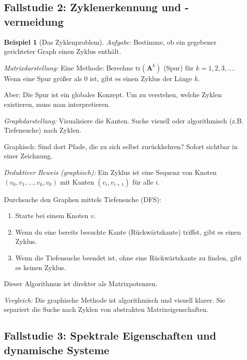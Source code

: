 \documentclass[12pt, a4paper]{article}
\theoremstyle{definition}
\newtheorem{example}[theorem]{Beispiel}
\theoremstyle{remark}
\newcommand{\vA}{\bm{A}}
\begin{document}
\subsection{Fallstudie 2: Zyklenerkennung und -vermeidung}
\label{subsec:fallstudie_zyklen}

\begin{example}[Das Zyklenproblem]
\label{ex:zyklenproblem}
\emph{Aufgabe:} Bestimme, ob ein gegebener gerichteter Graph einen Zyklus enthält.

\emph{Matrixdarstellung:}
Eine Methode: Berechne $\text{tr}(\vA^k)$ (Spur) für $k = 1, 2, 3, \ldots$. Wenn eine Spur größer als 0 ist, gibt es einen Zyklus der Länge $k$.

Aber: Die Spur ist ein globales Konzept. Um zu verstehen, welche Zyklen existieren, muss man interpretieren.

\emph{Graphdarstellung:}
Visualisiere die Kanten. Suche visuell oder algorithmisch (z.B. Tiefensuche) nach Zyklen.

Graphisch: Sind dort Pfade, die zu sich selbst zurückkehren? Sofort sichtbar in einer Zeichnung.

\emph{Deduktiver Beweis (graphisch):}
Ein Zyklus ist eine Sequenz von Knoten $(v_0, v_1, \ldots, v_k, v_0)$ mit Kanten $(v_i, v_{i+1})$ für alle $i$.

Durchsuche den Graphen mittels Tiefensuche (DFS):
\begin{enumerate}[label=(\alph*)]
  \item Starte bei einem Knoten $v$.
  \item Wenn du eine bereits besuchte Kante (Rückwärtskante) triffst, gibt es einen Zyklus.
  \item Wenn die Tiefensuche beendet ist, ohne eine Rückwärtskante zu finden, gibt es keinen Zyklus.
\end{enumerate}

Dieser Algorithmus ist direkter als Matrixpotenzen.

\emph{Vergleich:}
Die graphische Methode ist algorithmisch und visuell klarer. Sie separiert die Suche nach Zyklen von abstrakten Matrixeigenschaften.
\end{example}

\subsection{Fallstudie 3: Spektrale Eigenschaften und dynamische Systeme}
\label{subsec:fallstudie_spektral}
\end{document}
